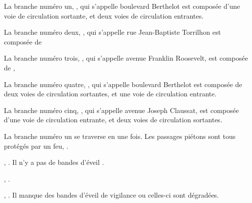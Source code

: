 \begin{appendix}
\newpar{}

La branche numéro un, , qui s'appelle boulevard Berthelot est composée d'une voie de circulation sortante, et deux voies de circulation entrantes.

\newpar{}

La branche numéro deux, , qui s'appelle rue Jean-Baptiste Torrilhon est composée de 

\newpar{}

La branche numéro trois, , qui s'appelle avenue Franklin Roosevelt, est composée de , 

\newpar{}

La branche numéro quatre, , qui s'appelle boulevard Berthelot est composée de deux voies de circulation sortantes, et une voie de circulation entrante.

\newpar{}

La branche numéro cinq, , qui s'appelle avenue Joseph Claussat,  est composée d'une voie de circulation entrante, et deux voies de circulation sortantes.

\newpar{}


La branche numéro un se traverse en une fois. Les passages piétons sont tous protégés par un feu, .  

\newpar{}

, . Il n'y a pas de bandes d'éveil . 

\newpar{}

,  . 

\newpar{}

, . Il manque des bandes d'éveil de vigilance ou celles-ci sont dégradées.

\newpar{}


\end{appendix}

